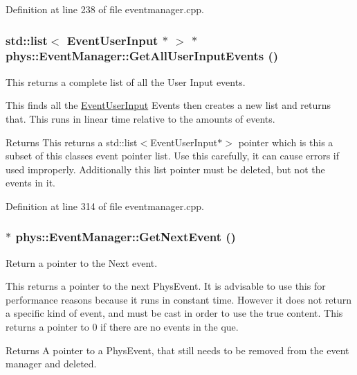 Definition at line 238 of file eventmanager.cpp.

\hypertarget{classphys_1_1EventManager_aef240dacae9479c4385d540e4feab867}{
\subsubsection[{GetAllUserInputEvents}]{\setlength{\rightskip}{0pt plus 5cm}std::list$<$ {\bf EventUserInput} $\ast$ $>$ $\ast$ phys::EventManager::GetAllUserInputEvents ()}}
\label{da/dde/classphys_1_1EventManager_aef240dacae9479c4385d540e4feab867}


This returns a complete list of all the User Input events. 

This finds all the \hyperlink{classphys_1_1EventUserInput}{EventUserInput} Events then creates a new list and returns that. This runs in linear time relative to the amounts of events. \begin{DoxyReturn}{Returns}
This returns a std::list$<$EventUserInput$\ast$$>$ pointer which is this a subset of this classes event pointer list. Use this carefully, it can cause errors if used improperly. Additionally this list pointer must be deleted, but not the events in it. 
\end{DoxyReturn}


Definition at line 314 of file eventmanager.cpp.

\hypertarget{classphys_1_1EventManager_aa0937763961aefc59aea197a8f9bc0dc}{
\subsubsection[{GetNextEvent}]{ $\ast$ phys::EventManager::GetNextEvent ()}}
\label{da/dde/classphys_1_1EventManager_aa0937763961aefc59aea197a8f9bc0dc}


Return a pointer to the Next event. 

This returns a pointer to the next PhysEvent. It is advisable to use this for performance reasons because it runs in constant time. However it does not return a specific kind of event, and must be cast in order to use the true content. This returns a pointer to 0 if there are no events in the que. \begin{DoxyReturn}{Returns}
A pointer to a PhysEvent, that still needs to be removed from the event manager and deleted. 
\end{DoxyReturn}


